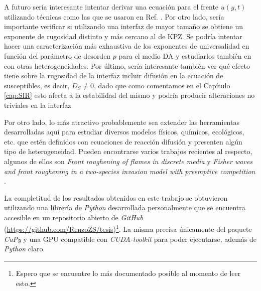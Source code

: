 A futuro sería interesante intentar derivar una ecuación para el frente $u(y,t)$ utilizando técnicas como las que se usaron en Ref. \cite{provatas1995scaling}. Por otro lado, sería importante verificar si utilizando una interfaz de mayor tamaño se obtiene un exponente de rugosidad distinto y más cercano al de KPZ. Se podría intentar hacer una caracterización más exhaustiva de los exponentes de universalidad en función del parámetro de desorden $p$ para el medio DA y estudiarlos también en con otras heterogeneidades. Por último, sería interesante también ver qué efecto tiene sobre la rugosidad de la interfaz incluir difusión en la ecuación de susceptibles, es decir, $D_{S} \neq 0$, dado que como comentamos en el Capítulo \ref{cap:SIR} esto afecta a la estabilidad del mismo y podría producir alteraciones no triviales en la interfaz.

Por otro lado, lo más atractivo probablemente sea extender las herramientas desarrolladas aquí para estudiar diversos modelos físicos, químicos, ecológicos, etc. que estén definidos con ecuaciones de reacción difusión y presenten algún tipo de heterogeneidad. Pueden encontrarse varios trabajos recientes al respecto, algunos de ellos son \textit{Front roughening of flames in discrete media} \cite{PhysRevE.96.013107} y \textit{Fisher waves and front roughening in a two-species invasion model with preemptive competition} \cite{PhysRevE.74.041116}.

La completitud de los resultados obtenidos en este trabajo se obtuvieron utilizando una librería de \textit{Python} desarrollada personalmente que se encuentra accesible en un repositorio abierto de \textit{GitHub} (\href{https://github.com/RenzoZS/tesis}{https://github.com/RenzoZS/tesis})\footnote{Espero que se encuentre lo más documentado posible al momento de leer esto.}. La misma precisa únicamente del paquete \textit{CuPy} y una GPU compatible con \textit{CUDA-toolkit} para poder ejecutarse, además de \textit{Python} claro.




